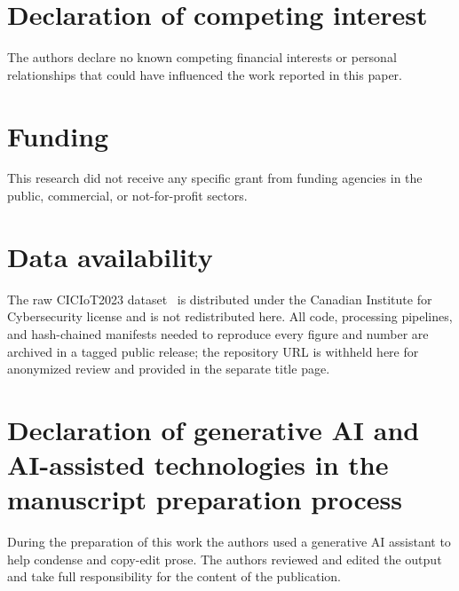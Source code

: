 \documentclass[3p,twocolumn]{elsarticle}
\begin{document}
\section*{Declaration of competing interest}
The authors declare no known competing financial interests or personal
relationships that could have influenced the work reported in this paper.

\section*{Funding}
This research did not receive any specific grant from funding agencies in the
public, commercial, or not-for-profit sectors.

\section*{Data availability}
The raw CICIoT2023 dataset~\cite{CICIoT2023Dataset} is distributed under the
Canadian Institute for Cybersecurity license and is not redistributed here. All
code, processing pipelines, and hash-chained manifests needed to reproduce every
figure and number are archived in a tagged public release; the repository URL is
withheld here for anonymized review and provided in the separate title page.

\section*{Declaration of generative AI and AI-assisted technologies in the
manuscript preparation process}
During the preparation of this work the authors used a generative AI assistant
to help condense and copy-edit prose. The authors reviewed and edited the
output and take full responsibility for the content of the publication.



\end{document}
